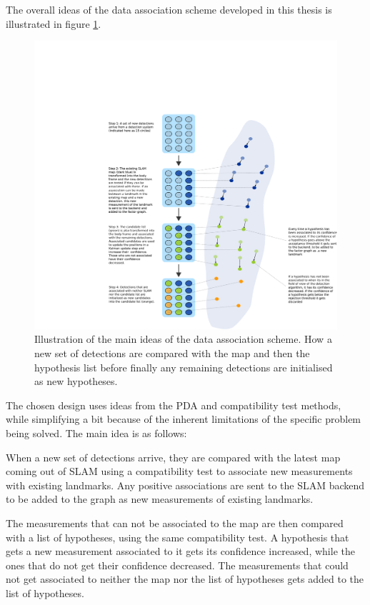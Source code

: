 The overall ideas of the data association scheme developed in this thesis is illustrated in figure \ref{Fig:FrontendDesign}. 

\begin{figure}
    \centering
    \includegraphics[width=\linewidth]{0_Images/3_Theory/sensor_fuser.pdf}
    \caption[Illustration of the main ideas of the data association scheme.]{Illustration of the main ideas of the data association scheme. How a new set of detections are compared with the map and then the hypothesis list before finally any remaining detections are initialised as new hypotheses.}
    \label{Fig:FrontendDesign}
\end{figure}


The chosen design uses ideas from the \gls{PDA} and compatibility test methods, while simplifying a bit because of the inherent limitations of the specific problem being solved. The main idea is as follows:

When a new set of detections arrive, they are compared with the latest map coming out of \gls{SLAM} using a compatibility test to associate new measurements with existing landmarks. Any positive associations are sent to the \gls{SLAM} backend to be added to the graph as new measurements of existing landmarks.

The measurements that can not be associated to the map are then compared with a list of hypotheses, using the same compatibility test. A hypothesis that gets a new measurement associated to it gets its confidence increased, while the ones that do not get their confidence decreased. The measurements that could not get associated to neither the map nor the list of hypotheses gets added to the list of hypotheses. 

